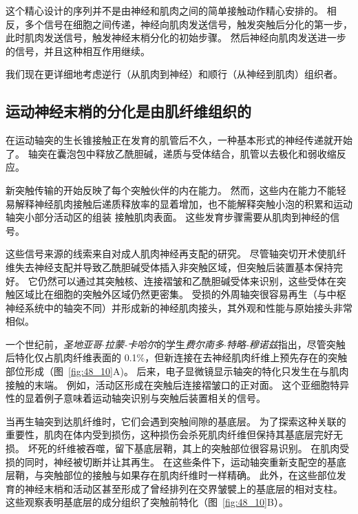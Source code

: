 这个精心设计的序列并不是由神经和肌肉之间的简单接触动作精心安排的。 
相反，多个信号在细胞之间传递，神经向肌肉发送信号，触发突触后分化的第一步，此时肌肉发送信号，触发神经末梢分化的初始步骤。
然后神经向肌肉发送进一步的信号，并且这种相互作用继续。


我们现在更详细地考虑逆行（从肌肉到神经）和顺行（从神经到肌肉）组织者。



\subsection{运动神经末梢的分化是由肌纤维组织的}


在运动轴突的生长锥接触正在发育的肌管后不久，一种基本形式的神经传递就开始了。
轴突在囊泡包中释放乙酰胆碱，递质与受体结合，肌管以去极化和弱收缩反应。


新突触传输的开始反映了每个突触伙伴的内在能力。
然而，这些内在能力不能轻易解释神经肌肉接触后递质释放率的显着增加，也不能解释突触小泡的积累和运动轴突小部分活动区的组装 接触肌肉表面。
这些发育步骤需要从肌肉到神经的信号。


这些信号来源的线索来自对成人肌肉神经再支配的研究。
尽管轴突切开术使肌纤维失去神经支配并导致乙酰胆碱受体插入非突触区域，但突触后装置基本保持完好。
它仍然可以通过其突触核、连接褶皱和乙酰胆碱受体来识别，这些受体在突触区域比在细胞的突触外区域仍然更密集。
受损的外周轴突很容易再生（与中枢神经系统中的轴突不同）并形成新的神经肌肉接头，其外观和性能与原始接头非常相似。


一个世纪前，\textit{圣地亚哥$\cdot$拉蒙-卡哈尔}的学生\textit{费尔南多$\cdot$特略-穆诺兹}指出，尽管突触后特化仅占肌肉纤维表面的 0.1\%，但新连接在去神经肌肉纤维上预先存在的突触部位形成（图~\ref{fig:48_10}A)。
后来，电子显微镜显示轴突的特化只发生在与肌肉接触的末端。
例如，活动区形成在突触后连接褶皱口的正对面。
这个亚细胞特异性的显着例子意味着运动轴突识别与突触后装置相关的信号。


当再生轴突到达肌纤维时，它们会遇到突触间隙的基底层。
为了探索这种关联的重要性，肌肉在体内受到损伤，这种损伤会杀死肌肉纤维但保持其基底层完好无损。
坏死的纤维被吞噬，留下基底层鞘，其上的突触部位很容易识别。
在肌肉受损的同时，神经被切断并让其再生。
在这些条件下，运动轴突重新支配空的基底层鞘，与突触部位的接触与如果存在肌肉纤维时一样精确。
此外，在这些部位发育的神经末梢和活动区甚至形成了曾经排列在交界皱襞上的基底层的相对支柱。
这些观察表明基底层的成分组织了突触前特化（图~\ref{fig:48_10}B）。


